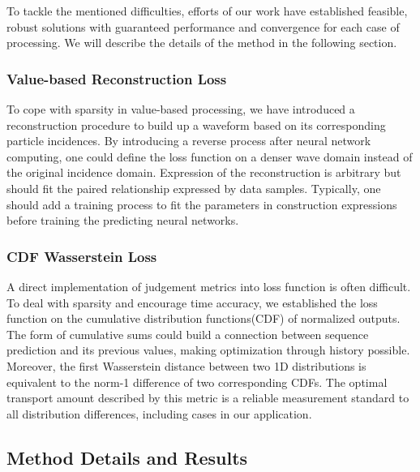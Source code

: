 \documentclass[12pt]{article}
\begin{document}
To tackle the mentioned difficulties, efforts of our work have established feasible, robust solutions with guaranteed performance and convergence for each case of processing. We will describe the details of the method in the following section.

\subsubsection{Value-based Reconstruction Loss}
To cope with sparsity in value-based processing, we have introduced a reconstruction procedure to build up a waveform based on its corresponding particle incidences. By introducing a reverse process after neural network computing, one could define the loss function on a denser wave domain instead of the original incidence domain. Expression of the reconstruction is arbitrary but should fit the paired relationship expressed by data samples. Typically, one should add a training process to fit the parameters in construction expressions before training the predicting neural networks.

\subsubsection{CDF Wasserstein Loss}
A direct implementation of judgement metrics into loss function is often difficult. To deal with sparsity and encourage time accuracy, we established the loss function on the cumulative distribution functions(CDF) of normalized outputs. The form of cumulative sums could build a connection between sequence prediction and its previous values, making optimization through history possible. Moreover, the first Wasserstein distance between two 1D distributions is equivalent to the norm-1 difference of two corresponding CDFs. The optimal transport amount described by this metric is a reliable measurement standard to all distribution differences, including cases in our application.

\subsection{Method Details and Results}


\end{document}
